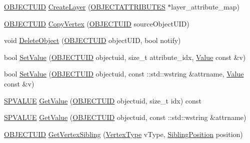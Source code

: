 \begin{DoxyCompactItemize}
\item 
\hyperlink{namespace_n_m_1_1_o_d_b_a262b64fab56baaa96e18bac4ada88265}{O\+B\+J\+E\+C\+T\+U\+I\+D} \hyperlink{class_n_m_1_1_o_d_b_1_1_i_object_database_a032bac6f5232ae0e5f542a0236d3911e}{Create\+Layer} (\hyperlink{namespace_n_m_1_1_o_d_b_a8770283da9792324e1afe8104d40123b}{O\+B\+J\+E\+C\+T\+A\+T\+T\+R\+I\+B\+U\+T\+E\+S} $\ast$layer\+\_\+attribute\+\_\+map)
\item 
\hyperlink{namespace_n_m_1_1_o_d_b_a262b64fab56baaa96e18bac4ada88265}{O\+B\+J\+E\+C\+T\+U\+I\+D} \hyperlink{class_n_m_1_1_o_d_b_1_1_i_object_database_a5a1efa4f6554bb600d65693cd7e5bb62}{Copy\+Vertex} (\hyperlink{namespace_n_m_1_1_o_d_b_a262b64fab56baaa96e18bac4ada88265}{O\+B\+J\+E\+C\+T\+U\+I\+D} source\+Object\+U\+I\+D)
\item 
void \hyperlink{class_n_m_1_1_o_d_b_1_1_i_object_database_a108c2b6c75443ac125f016ce3215f240}{Delete\+Object} (\hyperlink{namespace_n_m_1_1_o_d_b_a262b64fab56baaa96e18bac4ada88265}{O\+B\+J\+E\+C\+T\+U\+I\+D} object\+U\+I\+D, bool notify)
\item 
bool \hyperlink{class_n_m_1_1_o_d_b_1_1_i_object_database_ac233e4fc979b3ca7565cbaf796d9e379}{Set\+Value} (\hyperlink{namespace_n_m_1_1_o_d_b_a262b64fab56baaa96e18bac4ada88265}{O\+B\+J\+E\+C\+T\+U\+I\+D} objectuid, size\+\_\+t attribute\+\_\+idx, \hyperlink{class_n_m_1_1_o_d_b_1_1_value}{Value} const \&v)
\item 
bool \hyperlink{class_n_m_1_1_o_d_b_1_1_i_object_database_ae7c8dcaa99b3879a005c0e6324333bff}{Set\+Value} (\hyperlink{namespace_n_m_1_1_o_d_b_a262b64fab56baaa96e18bac4ada88265}{O\+B\+J\+E\+C\+T\+U\+I\+D} objectuid, const \+::std\+::wstring \&attrname, \hyperlink{class_n_m_1_1_o_d_b_1_1_value}{Value} const \&v)
\item 
\hyperlink{namespace_n_m_1_1_o_d_b_a76ab348a70a5cf877035b8281bdd3f7b}{S\+P\+V\+A\+L\+U\+E} \hyperlink{class_n_m_1_1_o_d_b_1_1_i_object_database_a4c33ad8984c795563075eea1fe20fa38}{Get\+Value} (\hyperlink{namespace_n_m_1_1_o_d_b_a262b64fab56baaa96e18bac4ada88265}{O\+B\+J\+E\+C\+T\+U\+I\+D} objectuid, size\+\_\+t idx) const 
\item 
\hyperlink{namespace_n_m_1_1_o_d_b_a76ab348a70a5cf877035b8281bdd3f7b}{S\+P\+V\+A\+L\+U\+E} \hyperlink{class_n_m_1_1_o_d_b_1_1_i_object_database_ad47323cfb9223ea97dc47845a43de8a3}{Get\+Value} (\hyperlink{namespace_n_m_1_1_o_d_b_a262b64fab56baaa96e18bac4ada88265}{O\+B\+J\+E\+C\+T\+U\+I\+D} objectuid, const \+::std\+::wstring \&attrname)
\item 
\hyperlink{namespace_n_m_1_1_o_d_b_a262b64fab56baaa96e18bac4ada88265}{O\+B\+J\+E\+C\+T\+U\+I\+D} \hyperlink{class_n_m_1_1_o_d_b_1_1_i_object_database_abf8b87f9d736141340887d10afbf9d9a}{Get\+Vertex\+Sibling} (\hyperlink{namespace_n_m_1_1_o_d_b_a74e0c94daaeea6f7e783c03a8c921022}{Vertex\+Type} v\+Type, \hyperlink{namespace_n_m_1_1_o_d_b_a1b474aa7e937112cda42381969dcb55e}{Sibling\+Position} position)

\end{DoxyCompactItemize}
